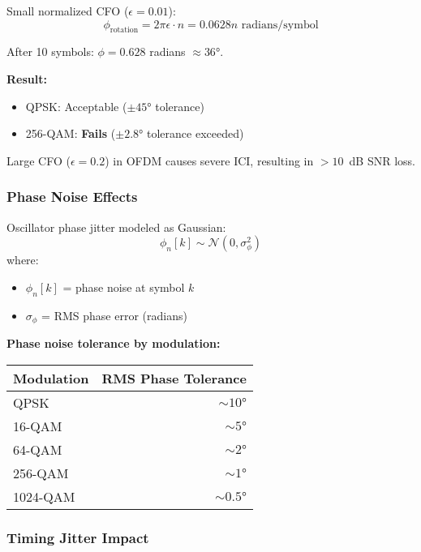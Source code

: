 Small normalized CFO ($\epsilon = 0.01$):
\begin{equation}
\phi_{\text{rotation}} = 2\pi \epsilon \cdot n = 0.0628n \text{ radians/symbol}
\end{equation}

After 10 symbols: $\phi = 0.628$ radians $\approx 36°$.

\textbf{Result:}
\begin{itemize}
\item QPSK: Acceptable ($\pm 45°$ tolerance)
\item 256-QAM: \textbf{Fails} ($\pm 2.8°$ tolerance exceeded)
\end{itemize}

Large CFO ($\epsilon = 0.2$) in OFDM causes severe ICI, resulting in $>10$~dB SNR loss.

\subsubsection{Phase Noise Effects}

Oscillator phase jitter modeled as Gaussian:
\begin{equation}
\phi_n[k] \sim \mathcal{N}(0, \sigma_\phi^2)
\end{equation}
where:
\begin{itemize}
\item $\phi_n[k]$ = phase noise at symbol $k$
\item $\sigma_\phi$ = RMS phase error (radians)
\end{itemize}

\textbf{Phase noise tolerance by modulation:}

\begin{center}
\begin{tabular}{@{}lr@{}}
\toprule
\textbf{Modulation} & \textbf{RMS Phase Tolerance} \\
\midrule
QPSK & $\sim 10°$ \\
16-QAM & $\sim 5°$ \\
64-QAM & $\sim 2°$ \\
256-QAM & $\sim 1°$ \\
1024-QAM & $\sim 0.5°$ \\
\bottomrule
\end{tabular}
\end{center}

\subsubsection{Timing Jitter Impact}

